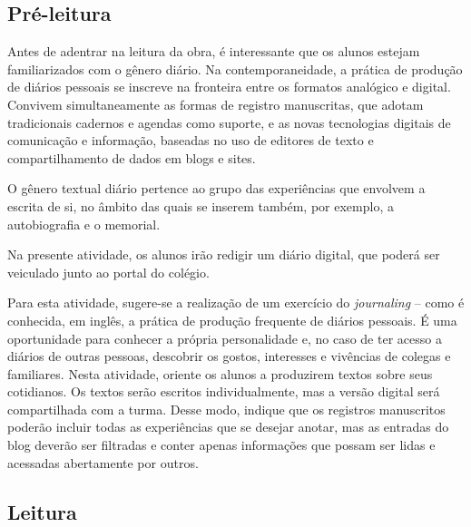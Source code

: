 \documentclass[12pt]{extarticle}
\begin{document}

\subsection{Pré-leitura}


Antes de adentrar na leitura da obra, é interessante que os
alunos estejam familiarizados com o gênero diário. Na contemporaneidade,
a prática de produção de diários pessoais se inscreve na fronteira entre
os formatos analógico e digital. Convivem simultaneamente as formas de
registro manuscritas, que adotam tradicionais cadernos e agendas como
suporte, e as novas tecnologias digitais de comunicação e informação,
baseadas no uso de editores de texto e compartilhamento de dados em
blogs e sites.

O gênero textual diário pertence ao grupo das experiências que envolvem
a escrita de si, no âmbito das quais se inserem também, por exemplo, a
autobiografia e o memorial.

Na presente atividade, os alunos irão redigir um diário digital, que
poderá ser veiculado junto ao portal do colégio.

Para esta atividade, sugere-se a realização de um exercício do
\emph{journaling} -- como é conhecida, em inglês, a prática de produção
frequente de diários pessoais. É uma oportunidade para conhecer a
própria personalidade e, no caso de ter acesso a diários de outras
pessoas, descobrir os gostos, interesses e vivências de colegas e
familiares. Nesta atividade, oriente os alunos a produzirem textos sobre
seus cotidianos. Os textos serão escritos individualmente, mas a versão
digital será compartilhada com a turma. Desse modo, indique que os
registros manuscritos poderão incluir todas as experiências que se
desejar anotar, mas as entradas do blog deverão ser filtradas e conter
apenas informações que possam ser lidas e acessadas abertamente por
outros.


\subsection{Leitura}

\end{document}
